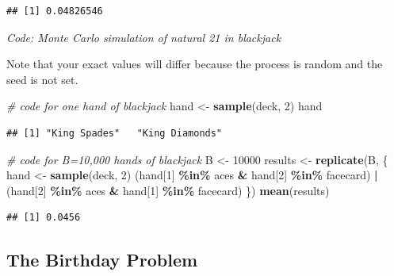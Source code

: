 \documentclass[
]{article}
\newenvironment{Shaded}{\begin{snugshade}}{\end{snugshade}}
\newcommand{\CommentTok}[1]{\textcolor[rgb]{0.56,0.35,0.01}{\textit{#1}}}
\newcommand{\DecValTok}[1]{\textcolor[rgb]{0.00,0.00,0.81}{#1}}
\newcommand{\KeywordTok}[1]{\textcolor[rgb]{0.13,0.29,0.53}{\textbf{#1}}}
\newcommand{\NormalTok}[1]{#1}
\newcommand{\OperatorTok}[1]{\textcolor[rgb]{0.81,0.36,0.00}{\textbf{#1}}}
\newcommand{\StringTok}[1]{\textcolor[rgb]{0.31,0.60,0.02}{#1}}
\begin{document}
\begin{verbatim}
## [1] 0.04826546
\end{verbatim}

\emph{Code: Monte Carlo simulation of natural 21 in blackjack}

Note that your exact values will differ because the process is random
and the seed is not set.

\begin{Shaded}
\begin{Highlighting}[]
\CommentTok{\# code for one hand of blackjack}
\NormalTok{hand \textless{}{-}}\StringTok{ }\KeywordTok{sample}\NormalTok{(deck, }\DecValTok{2}\NormalTok{)}
\NormalTok{hand}
\end{Highlighting}
\end{Shaded}

\begin{verbatim}
## [1] "King Spades"   "King Diamonds"
\end{verbatim}

\begin{Shaded}
\begin{Highlighting}[]
\CommentTok{\# code for B=10,000 hands of blackjack}
\NormalTok{B \textless{}{-}}\StringTok{ }\DecValTok{10000}
\NormalTok{results \textless{}{-}}\StringTok{ }\KeywordTok{replicate}\NormalTok{(B, \{}
\NormalTok{  hand \textless{}{-}}\StringTok{ }\KeywordTok{sample}\NormalTok{(deck, }\DecValTok{2}\NormalTok{)}
\NormalTok{  (hand[}\DecValTok{1}\NormalTok{] }\OperatorTok{\%in\%}\StringTok{ }\NormalTok{aces }\OperatorTok{\&}\StringTok{ }\NormalTok{hand[}\DecValTok{2}\NormalTok{] }\OperatorTok{\%in\%}\StringTok{ }\NormalTok{facecard) }\OperatorTok{|}\StringTok{ }\NormalTok{(hand[}\DecValTok{2}\NormalTok{] }\OperatorTok{\%in\%}\StringTok{ }\NormalTok{aces }\OperatorTok{\&}\StringTok{ }\NormalTok{hand[}\DecValTok{1}\NormalTok{] }\OperatorTok{\%in\%}\StringTok{ }\NormalTok{facecard)}
\NormalTok{\})}
\KeywordTok{mean}\NormalTok{(results)}
\end{Highlighting}
\end{Shaded}

\begin{verbatim}
## [1] 0.0456
\end{verbatim}

\hypertarget{the-birthday-problem}{%
\subsection{The Birthday Problem}\label{the-birthday-problem}}
\end{document}
